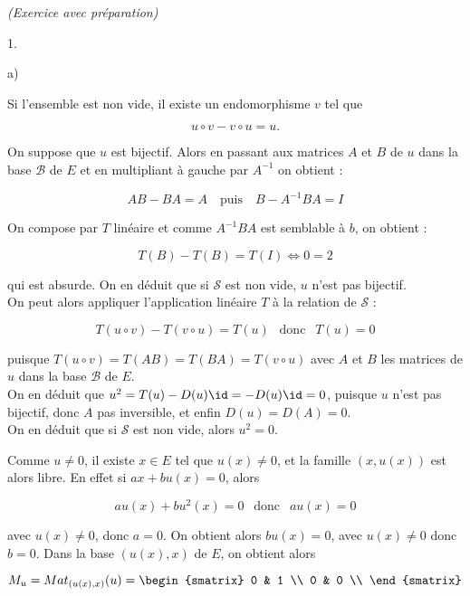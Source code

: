\documentclass[11pt]{article}%
\begin{document}
\begin{exercice}{\it (Exercice avec préparation)}
\begin{noliste}{1.}
\begin{noliste}{a)}
 \item Si l'ensemble est non vide, il existe un endomorphisme $v$ tel
que
 
\[
 u \circ v - v \circ u = u. 
\]

 On suppose que $u$ est bijectif. Alors en passant aux matrices $A$ et
$B$ de $u$ dans la base $\mathcal{B}$ de $E$ et en multipliant à gauche
par $A^{-1}$ on obtient :
 
\[
 A B - B A = A \ \ \ \text{ puis } \ \ \ B - A^{-1} B A = I 
\]

 On compose par $T$ linéaire et comme $A^{-1} B A$ est semblable à $b$,
on obtient : 
 
\[
 T ( B ) - T ( B) = T ( I ) \Longleftrightarrow 0 = 2 
\]

 qui est absurde. On en déduit que si $\mathcal{S}$ est non vide, $u$
n'est pas bijectif. \\

 On peut alors appliquer l'application linéaire $T$ à la relation de
$\mathcal{S}$ : 
 
\[
 T ( u \circ v ) - T ( v \circ u ) = T ( u ) \ \ \text{ donc } \ \ T (
u ) = 0 
\]

 puisque $T ( u \circ v ) = T ( A B ) = T ( B A ) = T ( v \circ u )$
avec $A$ et $B$ les matrices de $u$ dans la base $\mathcal{B}$ de $E$.
\\

 On en déduit que $u^{2} = T ( u) - D ( u ) \id = - D(u) \id = 0 $,
puisque $u$ n'est pas bijectif, donc $A$ pas inversible, et enfin $D
(u) = D ( A ) = 0$. \\

 On en déduit que si $\mathcal{S}$ est non vide, alors $u^{2} = 0$. \\

 \item Comme $u \neq 0$, il existe $x \in E$ tel que $u ( x ) \neq 0$,
et la famille $(x, u(x) )$ est alors libre. En effet si $a x + b u(x) =
0$, alors
 
\[
 a u(x) + b u^{2} (x) = 0 \ \ \text{ donc } \ \ a u(x) = 0 
\]

 avec $u(x) \neq 0$, donc $a = 0$. On obtient alors $ b u(x) = 0$, avec
$u(x) \neq 0$ donc $b = 0$. Dans la base $( u(x), x )$ de $E$, on
obtient alors
 
\[
 M_{u} = Mat_{ (u(x), x) } (u) = \begin{smatrix}
0 & 1 \\
0 & 0 \\
\end{smatrix}
\]


\end{noliste}
\end{noliste}
\end{exercice}
\end{document}
